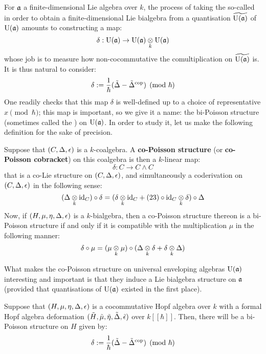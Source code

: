         For $\mathfrak{a}$ a finite-dimensional Lie algebra over $k$, the process of taking the so-called  in order to obtain a finite-dimensional Lie bialgebra from a quantisation $\widetilde{\mathrm{U}(\mathfrak{a})}$ of $\mathrm{U}(\mathfrak{a})$ amounts to constructing a  map:
            $$\delta: \rmU(\a) \to \rmU(\a) \tensor_k \rmU(\a)$$
        whose job is to measure how non-cocommutative the comultiplication on $\widetilde{\mathrm{U}(\mathfrak{a})}$ is. It is thus natural to consider:
            $$\delta := \frac1\hbar(\tilde{\Delta} - \tilde{\Delta}^{\mathrm{cop}}) \pmod{\hbar}$$
        One readily checks that this map $\delta$ is well-defined up to a choice of representative $x \pmod{\hbar}$; this map is important, so we give it a name: the bi-Poisson structure (sometimes called the ) on $\mathrm{U}(\mathfrak{a})$. In order to study it, let us make the following definition for the sake of precision.
        \begin{definition} \label{def: co/bi_poisson_structures}
            Suppose that $(C, \Delta, \epsilon)$ is a $k$-coalgebra. A \textbf{co-Poisson structure} (or \textbf{co-Poisson cobracket}) on this coalgebra is then a $k$-linear map:
                $$\delta: C \to C \wedge C$$
            that is a co-Lie structure on $(C, \Delta, \epsilon)$, and simultaneously a coderivation on $(C, \Delta, \epsilon)$ in the following sense:
                $$(\Delta \tensor_k \id_C) \circ \delta = (\delta \tensor_k \id_C + (23) \circ \id_C \tensor_k \delta) \circ \Delta$$
            Now, if $(H, \mu, \eta, \Delta, \epsilon)$ is a $k$-bialgebra, then a co-Poisson structure thereon is a bi-Poisson structure if and only if it is compatible with the multiplication $\mu$ in the following manner:
                $$\delta \circ \mu = (\mu \tensor_k \mu) \circ (\Delta \tensor_k \delta + \delta \tensor_k \Delta)$$
        \end{definition}
        What makes the co-Poisson structure on universal enveloping algebras $\mathrm{U}(\mathfrak{a})$ interesting and important is that they induce a Lie bialgebra structure on $\mathfrak{a}$ (provided that quantisations of $\mathrm{U}(\mathfrak{a})$ existed in the first place). 
        \begin{lemma} \label{lemma: bi_poisson_structures_from_hopf_algebra_deformations}
            Suppose that $(H, \mu, \eta, \Delta, \epsilon)$ is a cocommutative Hopf algebra over $k$ with a formal Hopf algebra deformation $(\tilde{H}, \tilde{\mu}, \tilde{\eta}, \tilde{\Delta}, \tilde{\epsilon})$ over $k[\![\hbar]\!]$. Then, there will be a bi-Poisson structure on $H$ given by:
                $$\delta := \frac{1}{\hbar}(\tilde{\Delta} - \tilde{\Delta}^{\mathrm{cop}}) \pmod{\hbar}$$
        \end{lemma}
